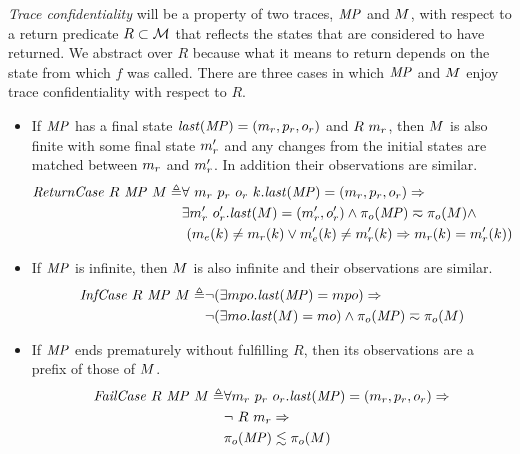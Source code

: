 \documentclass[acmsmall,review,anonymous]{acmart}\settopmatter{printfolios=true,printccs=false,printacmref=false}
\begin{document}
{

{\em Trace confidentiality} will be a property of two traces, \(\mathit{MP}\) and
\(M\), with respect to a return predicate \(R \subset {\mathcal M}\) that
reflects the states that are considered to have returned. We abstract over
\(R\) because what it means to return depends on the state from which
\(f\) was called. There are three cases in which \(\mathit{MP}\) and \(M\)
enjoy trace confidentiality with respect to \(R\).

\begin{itemize}
  \item If \(\mathit{MP}\) has a final state \(\mathit{last}(\mathit{MP}) = (m_r,p_r,o_r)\) and \(R\ \mach_r\), then \(M\) is also finite with
    some final state \(m_r'\) and any changes from the initial states are
    matched between \(m_r\) and \(m_r'\). In addition their
    observations are similar.
    \[\begin{split}
      \mathit{ReturnCase} ~ R ~ \mathit{MP} ~ M \triangleq &
      \forall ~ m_r ~ p_r ~ o_r ~ k . \mathit{last}(\mathit{MP}) =
        (m_r,p_r,o_r) \Rightarrow \\
      & \exists m_r' ~ o_r' . \mathit{last}(M) = (m_r',o_r')
        \land \pi_o(\mathit{MP}) \eqsim \pi_o(M) \land \\
      & ~ (m_e(k) \not = m_r(k)
        \lor m_e'(k) \not = m_r'(k) \Rightarrow
      m_r(k) = m_r'(k))
    \end{split}\]
  \item If \(\mathit{MP}\) is infinite, then \(M\) is also infinite and their
  observations are similar.
    \[\begin{split}
      \mathit{InfCase} ~ R ~ \mathit{MP} ~ M \triangleq
      & \neg (\exists mpo . \mathit{last}(\mathit{MP}) = mpo) \Rightarrow \\
      & \neg (\exists mo . \mathit{last}(M) = mo)
        \land \pi_o(\mathit{MP}) \eqsim \pi_o(M)
    \end{split}\]
\item If \(\mathit{MP}\) ends prematurely without fulfilling \(R\), then
  its observations are a prefix of those of \(M\).
    \[\begin{split}
      \mathit{FailCase} ~ R ~ \mathit{MP} ~ M \triangleq
      & \forall m_r ~ p_r ~ o_r .
        \mathit{last}(\mathit{MP}) = (m_r,p_r,o_r) \Rightarrow \\
      & \neg ~ R ~ m_r \Rightarrow \\
      & \pi_o(\mathit{MP}) \lesssim \pi_o(M)
    \end{split}\]
\end{itemize}

}
\end{document}
